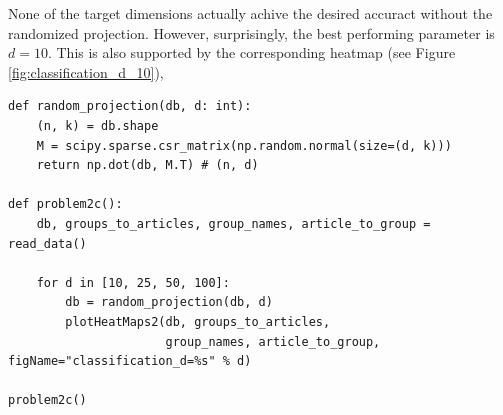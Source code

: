 \documentclass[12pt]{article}
\begin{document}
\begin{enumerate}[label=(\alph*)]
      None of the target dimensions actually achive the desired accuract without the randomized projection. However, surprisingly, the best performing parameter is $d=10$. This is also supported by the corresponding heatmap (see Figure \ref{fig:classification_d_10}),

\begin{verbatim}
def random_projection(db, d: int):
    (n, k) = db.shape
    M = scipy.sparse.csr_matrix(np.random.normal(size=(d, k)))
    return np.dot(db, M.T) # (n, d)

def problem2c():
    db, groups_to_articles, group_names, article_to_group = read_data()
    
    for d in [10, 25, 50, 100]:
        db = random_projection(db, d)
        plotHeatMaps2(db, groups_to_articles,
                      group_names, article_to_group, figName="classification_d=%s" % d)

problem2c()
\end{verbatim}
    

\end{enumerate}
\end{document}
